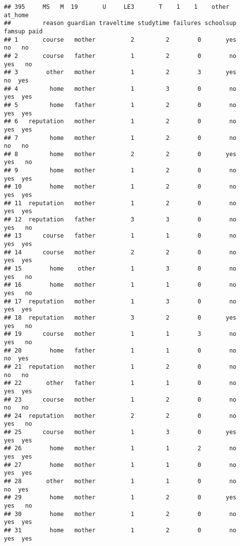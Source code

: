 \documentclass[
]{article}
\begin{document}
\begin{verbatim}
## 395     MS   M  19       U     LE3       T    1    1    other  at_home
##         reason guardian traveltime studytime failures schoolsup famsup paid
## 1       course   mother          2         2        0       yes     no   no
## 2       course   father          1         2        0        no    yes   no
## 3        other   mother          1         2        3       yes     no  yes
## 4         home   mother          1         3        0        no    yes  yes
## 5         home   father          1         2        0        no    yes  yes
## 6   reputation   mother          1         2        0        no    yes  yes
## 7         home   mother          1         2        0        no     no   no
## 8         home   mother          2         2        0       yes    yes   no
## 9         home   mother          1         2        0        no    yes  yes
## 10        home   mother          1         2        0        no    yes  yes
## 11  reputation   mother          1         2        0        no    yes  yes
## 12  reputation   father          3         3        0        no    yes   no
## 13      course   father          1         1        0        no    yes  yes
## 14      course   mother          2         2        0        no    yes  yes
## 15        home    other          1         3        0        no    yes   no
## 16        home   mother          1         1        0        no    yes   no
## 17  reputation   mother          1         3        0        no    yes  yes
## 18  reputation   mother          3         2        0       yes    yes   no
## 19      course   mother          1         1        3        no    yes   no
## 20        home   father          1         1        0        no     no  yes
## 21  reputation   mother          1         2        0        no     no   no
## 22       other   father          1         1        0        no    yes  yes
## 23      course   mother          1         2        0        no     no   no
## 24  reputation   mother          2         2        0        no    yes   no
## 25      course   mother          1         3        0       yes    yes  yes
## 26        home   mother          1         1        2        no    yes  yes
## 27        home   mother          1         1        0        no    yes  yes
## 28       other   mother          1         1        0        no     no  yes
## 29        home   mother          1         2        0       yes    yes   no
## 30        home   mother          1         2        0        no    yes  yes
## 31        home   mother          1         2        0        no    yes  yes

\end{verbatim}
\end{document}
